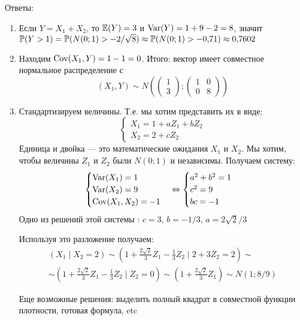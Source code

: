 \documentclass[pdftex,12pt,a4paper]{article}
\begin{document}
\begin{enumerate}
Ответы:
\begin{enumerate}
\item Если $Y=X_1+X_2$, то $\E(Y)=3$ и $\Var(Y)=1+9-2=8$, значит $\P(Y>1)=\P(N(0;1)>-2/\sqrt{8})\approx \P(N(0;1)>-0{,}71)\approx 0{,}7602$
\item Находим $\Cov(X_1,Y)=1-1=0$. Итого: вектор имеет совместное нормальное распределение с
\begin{equation}
(X_1,Y)\sim N\left(
\left(\begin{array}{l} 
{1} \\ 
{3}
\end{array}\right);
\left(\begin{array}{cc} 
{1} & {0} \\ 
{0} & {8} 
\end{array}\right)
\right)
\end{equation}
\item Стандартизируем величины. Т.е. мы хотим представить их в виде:
\begin{equation}
\begin{cases}
X_1=1+aZ_1+bZ_2 \\
X_2=2+cZ_2
\end{cases}
\end{equation}
Единица и двойка --- это математические ожидания $X_1$ и $X_2$. Мы хотим, чтобы величины $Z_1$ и $Z_2$ были $N(0;1)$ и независимы.
Получаем систему:
\begin{equation}
\begin{cases}
\Var(X_1)=1 \\
\Var(X_2)=9 \\
\Cov(X_1,X_2)=-1 
\end{cases} \Leftrightarrow
\begin{cases}
a^2+b^2=1 \\
c^2=9 \\
bc=-1 
\end{cases}
\end{equation}
Одно из решений этой системы : $c=3$, $b=-1/3$, $a=2\sqrt{2}/3$

Используя это разложение получаем:
\begin{multline}
\left( X_1 \mid X_2=2\right) \sim \left( 1+\frac{2\sqrt{2}}{3}Z_1-\frac{1}{3}Z_2\mid 2+ 3Z_2=2\right)\sim \\
\sim\left(1+\frac{2\sqrt{2}}{3}Z_1-\frac{1}{3}Z_2\mid Z_2=0\right)\sim \left(1+\frac{2\sqrt{2}}{3}Z_1\right)\sim N(1;8/9)
\end{multline}

Еще возможные решения: выделить полный квадрат в совместной функции плотности, готовая формула, etc


\end{enumerate}
\end{enumerate}
\end{document}
